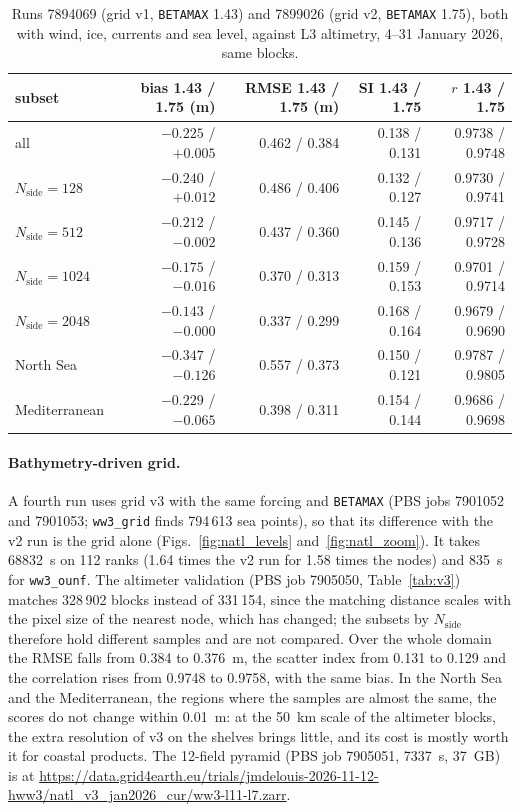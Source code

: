 \documentclass[11pt,a4paper]{article}
\newcommand{\nside}{N_{\mathrm{side}}}
\begin{document}
\begin{table}[H]
\centering\small
\begin{tabular}{lrrrr}
\toprule
subset & bias 1.43 / 1.75 (m) & RMSE 1.43 / 1.75 (m) & SI 1.43 / 1.75 & $r$ 1.43 / 1.75 \\
\midrule
all          & $-0.225$ / $+0.005$ & 0.462 / 0.384 & 0.138 / 0.131 & 0.9738 / 0.9748 \\
$\nside=128$ & $-0.240$ / $+0.012$ & 0.486 / 0.406 & 0.132 / 0.127 & 0.9730 / 0.9741 \\
$\nside=512$ & $-0.212$ / $-0.002$ & 0.437 / 0.360 & 0.145 / 0.136 & 0.9717 / 0.9728 \\
$\nside=1024$& $-0.175$ / $-0.016$ & 0.370 / 0.313 & 0.159 / 0.153 & 0.9701 / 0.9714 \\
$\nside=2048$& $-0.143$ / $-0.000$ & 0.337 / 0.299 & 0.168 / 0.164 & 0.9679 / 0.9690 \\
North Sea    & $-0.347$ / $-0.126$ & 0.557 / 0.373 & 0.150 / 0.121 & 0.9787 / 0.9805 \\
Mediterranean& $-0.229$ / $-0.065$ & 0.398 / 0.311 & 0.154 / 0.144 & 0.9686 / 0.9698 \\
\bottomrule
\end{tabular}
\caption{Runs 7894069 (grid v1, \texttt{BETAMAX} 1.43) and 7899026 (grid
v2, \texttt{BETAMAX} 1.75), both with wind, ice, currents and sea level,
against L3 altimetry, 4--31 January 2026, same blocks.}
\label{tab:betamax}
\end{table}

\paragraph{Bathymetry-driven grid.} A fourth run uses grid v3 with the
same forcing and \texttt{BETAMAX} (PBS jobs 7901052 and 7901053;
\texttt{ww3\_grid} finds 794\,613 sea points), so that its difference with
the v2 run is the grid alone (Figs.~\ref{fig:natl_levels}
and~\ref{fig:natl_zoom}). It takes
\SI{68832}{s} on 112 ranks (1.64 times the v2 run for 1.58 times the
nodes) and \SI{835}{s} for \texttt{ww3\_ounf}. The altimeter validation (PBS
job 7905050, Table~\ref{tab:v3}) matches 328\,902 blocks instead of
331\,154, since the matching distance scales with the pixel size of the
nearest node, which has changed; the subsets by $\nside$ therefore hold
different samples and are not compared. Over the whole domain the RMSE
falls from 0.384 to \SI{0.376}{m}, the scatter index from 0.131 to 0.129
and the correlation rises from 0.9748 to 0.9758, with the same bias. In the
North Sea and the Mediterranean, the regions where the samples are almost
the same, the scores do not change within \SI{0.01}{m}: at the \SI{50}{km}
scale of the altimeter blocks, the extra resolution of v3 on the shelves
brings little, and its cost is mostly worth it for coastal products. The
12-field pyramid (PBS job 7905051, \SI{7337}{s}, \SI{37}{GB}) is at
\url{https://data.grid4earth.eu/trials/jmdelouis-2026-11-12-hww3/natl_v3_jan2026_cur/ww3-l11-l7.zarr}.
\end{document}
